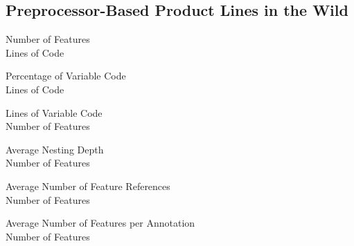\subsection{Preprocessor-Based Product Lines in the Wild}
\begin{frame}{\myframetitle\mysource{\fortyproductlines}}
	\begin{mycolumns}[forget]
		\begin{exampletight}{Number of Features}
			\centering{}\\Lines of Code
		\end{exampletight}
	\mynextcolumn
		\begin{exampletight}{Percentage of Variable Code}
			\centering{}\\Lines of Code
		\end{exampletight}
	\end{mycolumns}
\end{frame}

\begin{frame}{\myframetitle\mysource{\fortyproductlines}}
	\begin{mycolumns}[forget]
		\begin{exampletight}{Lines of Variable Code}
			\centering{}\\Number of Features
		\end{exampletight}
	\mynextcolumn
		\begin{exampletight}{Average Nesting Depth}
			\centering{}\\Number of Features
		\end{exampletight}
	\end{mycolumns}
\end{frame}

\begin{frame}{\myframetitle\mysource{\fortyproductlines}}
	\begin{mycolumns}[forget]
		\begin{exampletight}{Average Number of Feature References}
			\centering{}\\Number of Features
		\end{exampletight}
	\mynextcolumn
		\begin{exampletight}{Average Number of Features per Annotation}
			\centering{}\\Number of Features
		\end{exampletight}
	\end{mycolumns}
\end{frame}

